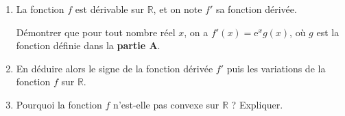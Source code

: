 \medskip

\begin{enumerate}
\item La fonction $f$ est dérivable sur $\mathbb{R}$, et on note $f'$ sa fonction dérivée.

Démontrer que pour tout nombre réel $x$, on a $f'(x)=\mathrm{e}^{x} g(x)$, où $g$ est la fonction définie dans la \textbf{partie A}.
\item En déduire alors le signe de la fonction dérivée $f'$ puis les variations de la fonction $f$ sur $\mathbb{R}$.
\item Pourquoi la fonction $f$ n'est-elle pas convexe sur $\mathbb{R}$ ? Expliquer.
\end{enumerate}

\bigskip
